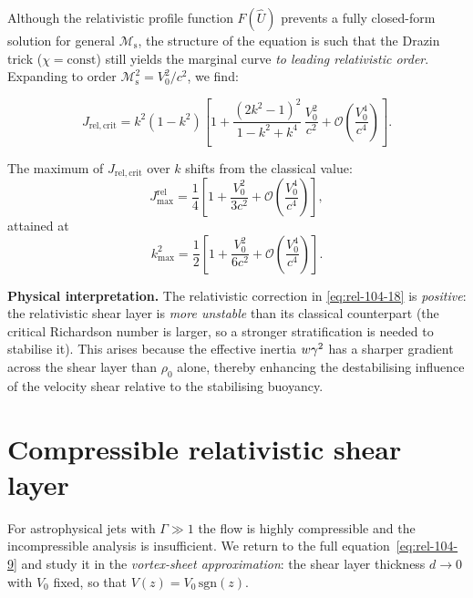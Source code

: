 Although the relativistic profile function $F(\hat{U})$ prevents a
fully closed-form solution for general $\mathcal{M}_{\mathrm{s}}$, the
structure of the equation is such that the Drazin trick
($\chi=\text{const}$) still yields the marginal curve
\emph{to leading relativistic order}.  Expanding to order
$\mathcal{M}_{\mathrm{s}}^2 = V_0^2/c^2$, we find:

\begin{equation}
\label{eq:rel-104-17}
\boxed{J_{\mathrm{rel,crit}} = k^2(1-k^2)
  \left[1 + \frac{(2k^2-1)^2}{1-k^2+k^4}\,
  \frac{V_0^2}{c^2} + \mathcal{O}\!\left(\frac{V_0^4}{c^4}\right)
  \right].}
\end{equation}

The maximum of $J_{\mathrm{rel,crit}}$ over $k$ shifts from the classical
value:
\begin{equation}
\label{eq:rel-104-18}
J_{\max}^{\mathrm{rel}} = \frac{1}{4}\!\left[1
  + \frac{V_0^2}{3c^2}
  + \mathcal{O}\!\left(\frac{V_0^4}{c^4}\right)\right],
\end{equation}
attained at
\begin{equation}
\label{eq:rel-104-19}
k_{\max}^2 = \frac{1}{2}\!\left[1
  + \frac{V_0^2}{6c^2}
  + \mathcal{O}\!\left(\frac{V_0^4}{c^4}\right)\right].
\end{equation}

\textbf{Physical interpretation.}  The relativistic correction in
\eqref{eq:rel-104-18} is \emph{positive}: the relativistic shear layer
is \emph{more unstable} than its classical counterpart (the critical
Richardson number is larger, so a stronger stratification is needed to
stabilise it).  This arises because the effective inertia
$w\gamma^2$ has a sharper gradient across the shear layer than
$\rho_0$ alone, thereby enhancing the destabilising influence of the
velocity shear relative to the stabilising buoyancy.

\section{Compressible relativistic shear layer}
\label{sec:rel-11-104-comp}

For astrophysical jets with $\Gamma\gg 1$ the flow is highly
compressible and the incompressible analysis is insufficient.  We
return to the full equation~\eqref{eq:rel-104-9} and study it
in the \emph{vortex-sheet approximation}: the shear layer thickness
$d\to 0$ with $V_0$ fixed, so that
$V(z)=V_0\,\mathrm{sgn}(z)$.

